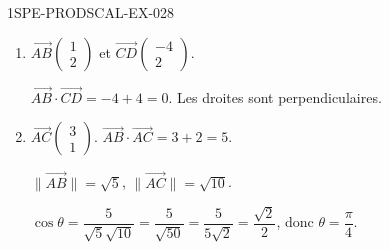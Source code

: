 \begin{corrige}{1SPE-PRODSCAL-EX-028}
\begin{enumerate}
\item $\overrightarrow{AB}\begin{pmatrix} 1 \\ 2 \end{pmatrix}$ et $\overrightarrow{CD}\begin{pmatrix} -4 \\ 2 \end{pmatrix}$.

$\overrightarrow{AB} \cdot \overrightarrow{CD} = -4 + 4 = 0$. Les droites sont perpendiculaires.

\item $\overrightarrow{AC}\begin{pmatrix} 3 \\ 1 \end{pmatrix}$. $\overrightarrow{AB} \cdot \overrightarrow{AC} = 3 + 2 = 5$.

$\|\overrightarrow{AB}\| = \sqrt{5}$, $\|\overrightarrow{AC}\| = \sqrt{10}$.

$\cos\theta = \dfrac{5}{\sqrt{5}\sqrt{10}} = \dfrac{5}{\sqrt{50}} = \dfrac{5}{5\sqrt{2}} = \dfrac{\sqrt{2}}{2}$, donc $\theta = \dfrac{\pi}{4}$.
\end{enumerate}
\end{corrige}
